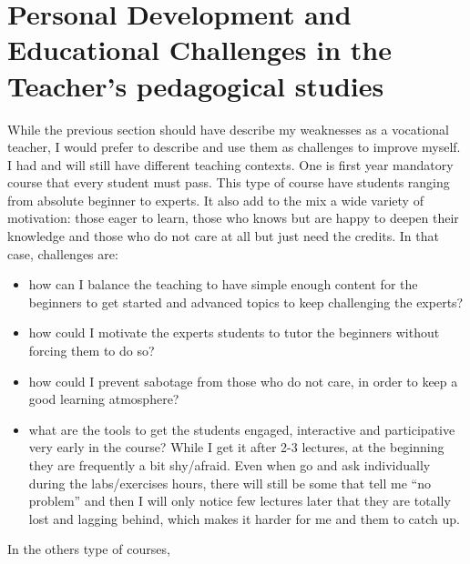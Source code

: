 \section{Personal Development and Educational Challenges in the Teacher's pedagogical studies}

While the previous section should have describe my weaknesses as a vocational teacher, I would prefer to describe and use them as challenges to improve myself.
I had and will still have different teaching contexts. 
One is first year mandatory course that every student must pass.
This type of course have students ranging from absolute beginner to experts.
It also add to the mix a wide variety of motivation: those eager to learn, those who knows but are happy to deepen their knowledge and those who do not care at all but just need the credits.
In that case, challenges are:
\begin{itemize}
\item how can I balance the teaching to have simple enough content for the beginners to get started and advanced topics to keep challenging the experts?
\item how could I motivate the experts students to tutor the beginners without forcing them to do so?
\item how could I prevent sabotage from those who do not care, in order to keep a good learning atmosphere?
\item what are the tools to get the students engaged, interactive and participative very early in the course? While I get it after 2-3 lectures, at the beginning they are frequently a bit shy/afraid. Even when go and ask individually during the labs/exercises hours, there will still be some that tell me ``no problem'' and then I will only notice few lectures later that they are totally lost and lagging behind, which makes it harder for me and them to catch up. 
\end{itemize}
  
In the others type of courses, 